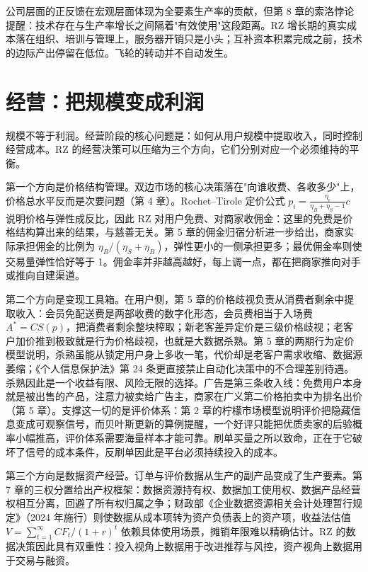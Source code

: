 公司层面的正反馈在宏观层面体现为全要素生产率的贡献，但第 8 章的索洛悖论提醒：技术存在与生产率增长之间隔着"有效使用"这段距离。RZ 增长期的真实成本落在组织、培训与管理上，服务器开销只是小头；互补资本积累完成之前，技术的边际产出停留在低位。飞轮的转动并不自动发生。

\section{经营：把规模变成利润}

规模不等于利润。经营阶段的核心问题是：如何从用户规模中提取收入，同时控制经营成本。RZ 的经营决策可以压缩为三个方向，它们分别对应一个必须维持的平衡。

第一个方向是价格结构管理。双边市场的核心决策落在"向谁收费、各收多少"上，价格总水平反而是次要问题（第 4 章）。Rochet--Tirole 定价公式 $p_i=\frac{\eta_i}{\eta_B+\eta_S-1}c$ 说明价格与弹性成反比，因此 RZ 对用户免费、对商家收佣金：这里的免费是价格结构算出来的结果，与慈善无关。第 5 章的佣金归宿分析进一步给出，商家实际承担佣金的比例为 $\eta_B/(\eta_S+\eta_B)$，弹性更小的一侧承担更多；最优佣金率则使交易量弹性恰好等于 1。佣金率并非越高越好，每上调一点，都在把商家推向对手或推向自建渠道。

第二个方向是变现工具箱。在用户侧，第 5 章的价格歧视负责从消费者剩余中提取收入：会员免配送费是两部收费的数字化形态，会员费相当于入场费 $A^{*}=CS(p)$，把消费者剩余整块榨取；新老客差异定价是三级价格歧视；老客户加价推到极致就是行为价格歧视，也就是大数据杀熟。第 5 章的两期行为定价模型说明，杀熟虽能从锁定用户身上多收一笔，代价却是老客户需求收缩、数据源萎缩；《个人信息保护法》第 24 条更直接禁止自动化决策中的不合理差别待遇。杀熟因此是一个收益有限、风险无限的选择。广告是第三条收入线：免费用户本身就是被出售的产品，注意力被卖给广告主，商家在广义第二价格拍卖中为排名出价（第 5 章）。支撑这一切的是评价体系：第 2 章的柠檬市场模型说明评价把隐藏信息变成可观察信号，而贝叶斯更新的算例提醒，一个好评只能把优质卖家的后验概率小幅推高，评价体系需要海量样本才能可靠。刷单买量之所以致命，正在于它破坏了信号的成本条件，反刷单因此是平台必须持续投入的成本。

第三个方向是数据资产经营。订单与评价数据从生产的副产品变成了生产要素。第 7 章的三权分置给出产权框架：数据资源持有权、数据加工使用权、数据产品经营权相互分离，回避了所有权归属之争；财政部《企业数据资源相关会计处理暂行规定》（2024 年施行）则使数据从成本项转为资产负债表上的资产项，收益法估值 $V=\sum_{t=1}^{\infty}CF_t/(1+r)^t$ 依赖具体使用场景，摊销年限难以精确估计。RZ 的数据决策因此具有双重性：投入视角上数据用于改进推荐与风控，资产视角上数据用于交易与融资。

